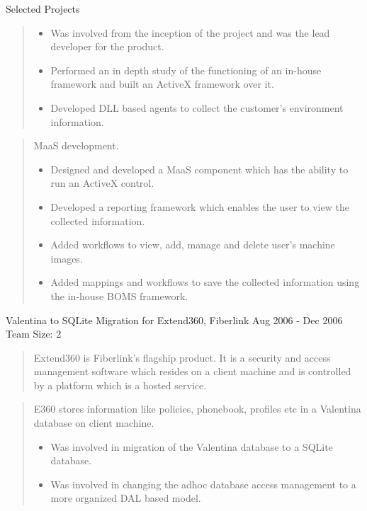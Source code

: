 \documentclass{resume}
\newcommand{\teamsize}{\\\sc\footnotesize Team Size: }
\begin{document}
\begin{category}{Selected Projects}{}
\begin{quote}
            \begin{itemize}
                \item Was involved from the inception of the project and was the
                    lead developer for the product.
                \item Performed an in depth study of the functioning of an
                    in-house framework and built an ActiveX framework over it.
                \item Developed DLL based agents to collect the customer's
                    environment information.
            \end{itemize}
        \end{quote}
        \begin{quote}
            MaaS development.
            \begin{itemize}
                \item Designed and developed a MaaS component which has the
                    ability to run an ActiveX control.
                \item Developed a reporting framework which enables the user to
                    view the collected information.
                \item Added workflows to view, add, manage and delete user's
                    machine images.
                \item Added mappings and workflows to save the collected
                    information using the in-house BOMS framework.
            \end{itemize}
        \end{quote}

    \item {\topic Valentina to SQLite Migration for Extend360,} Fiberlink
        {\period Aug 2006 - Dec 2006}
        {\teamsize 2}
        \begin{quote}
            Extend360 is Fiberlink's flagship product. It is a security and
            access management software which resides on a client machine and is
            controlled by a platform which is a hosted service.
        \end{quote}
        \begin{quote}
            E360 stores information like policies, phonebook, profiles etc in a
            Valentina database on client machine.
            \begin{itemize}
                \item Was involved in migration of the Valentina database to a
                    SQLite database.
                \item Was involved in changing the adhoc database access management
                    to a more organized DAL based model.
            \end{itemize}
        \end{quote}


\end{category}
\end{document}
